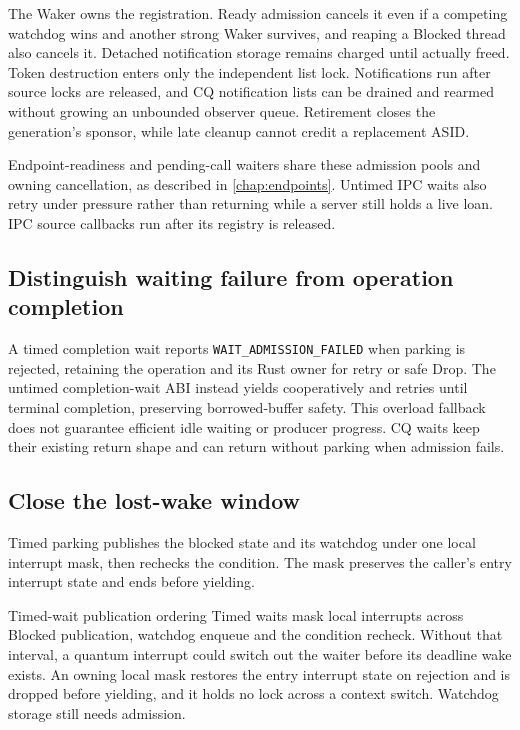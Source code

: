The Waker owns the registration. Ready admission cancels it even if a competing
watchdog wins and another strong Waker survives, and reaping a Blocked thread also
cancels it. Detached notification storage remains charged until actually freed.
Token destruction enters only the independent list lock. Notifications run
after source locks are released, and CQ notification lists can be drained and
rearmed without growing an unbounded observer queue. Retirement closes the
generation's sponsor, while late cleanup cannot credit a replacement ASID.

Endpoint-readiness and pending-call waiters share these admission pools and
owning cancellation, as described in \autoref{chap:endpoints}. Untimed IPC waits
also retry under pressure rather than returning while a server still holds a
live loan. IPC source callbacks run after its registry is released.

\subsection{Distinguish waiting failure from operation completion}

A timed completion wait reports \texttt{WAIT\_ADMISSION\_FAILED} when parking
is rejected, retaining the operation and its Rust owner for retry or safe Drop.
The untimed completion-wait ABI instead yields cooperatively and retries until
terminal completion, preserving borrowed-buffer safety. This overload fallback
does not guarantee efficient idle waiting or producer progress. CQ waits keep
their existing return shape and can return without parking when admission fails.

\subsection{Close the lost-wake window}

Timed parking publishes the blocked state and its watchdog under one local
interrupt mask, then rechecks the condition. The mask preserves the caller's
entry interrupt state and ends before yielding.

\begin{implementationdetail}{Timed-wait publication ordering}
Timed waits mask local interrupts across Blocked publication, watchdog enqueue
and the condition recheck. Without that interval, a quantum interrupt could
switch out the waiter before its deadline wake exists. An owning local mask
restores the entry interrupt state on rejection and is dropped before yielding, and
it holds no lock across a context switch. Watchdog storage still needs admission.
\end{implementationdetail}

